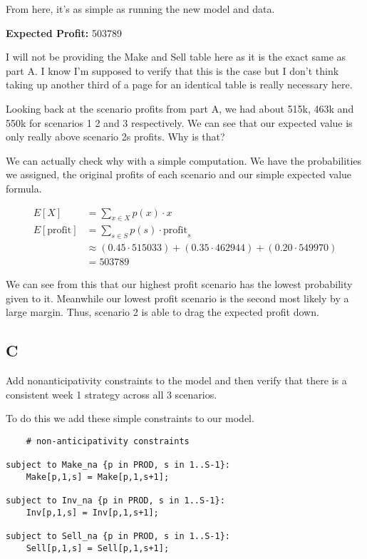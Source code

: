 From here, it's as simple as running the new model and data.

\noindent\textbf{Expected Profit:} 503789

I will not be providing the Make and Sell table here as it is the exact same as part A. I know I'm supposed to verify that this is the case but I don't think taking up another third of a page for an identical table is really necessary here.

Looking back at the scenario profits from part A, we had about 515k, 463k and 550k for scenarios 1 2 and 3 respectively. We can see that our expected value is only really above scenario 2s profits. Why is that?

We can actually check why with a simple computation. We have the probabilities we assigned, the original profits of each scenario and our simple expected value formula. 

\begin{align*}
	E[X] &= \sum_{x \in X} p(x) \cdot x \\
	E[\text{profit}] &= \sum_{s \in S} p(s) \cdot \text{profit}_s \\
	&\approx (0.45 \cdot 515033) + (0.35 \cdot 462944) + (0.20 \cdot 549970) \\
	&= 503789
\end{align*}

We can see from this that our highest profit scenario has the lowest probability given to it. Meanwhile our lowest profit scenario is the second most likely by a large margin. Thus, scenario 2 is able to drag the expected profit down.

\subsection*{C}

\prob

Add nonanticipativity constraints to the model and then verify that there is a consistent week 1 strategy across all 3 scenarios.

\sol

To do this we add these simple constraints to our model.

\begin{lstlisting}
    # non-anticipativity constraints

subject to Make_na {p in PROD, s in 1..S-1}:
    Make[p,1,s] = Make[p,1,s+1];

subject to Inv_na {p in PROD, s in 1..S-1}:
    Inv[p,1,s] = Inv[p,1,s+1];

subject to Sell_na {p in PROD, s in 1..S-1}:
    Sell[p,1,s] = Sell[p,1,s+1];
\end{lstlisting}

